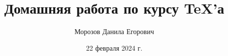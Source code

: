 \documentclass{article}
\title{\bfseries Домашняя работа \textnumero 7 по курсу \TeX'а}
\author{Морозов Данила Егорович}
\date{22 февраля 2024 г.}
\begin{document}

\pagebreak




\end{document}
